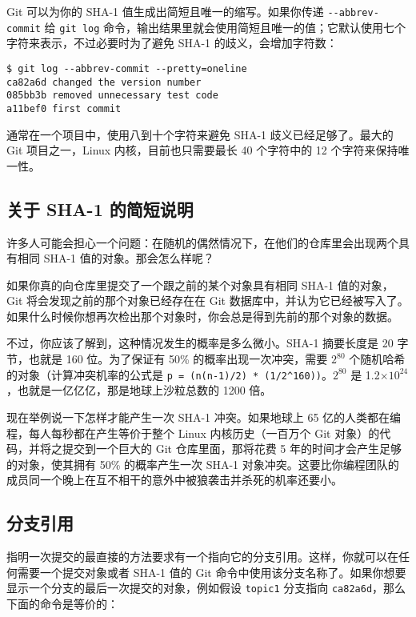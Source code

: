 \documentclass[a4paper]{book}
\newcommand{\e}[1]{$ \times 10^{#1}$}
\begin{document}
Git 可以为你的 SHA-1 值生成出简短且唯一的缩写。如果你传递 \texttt{-{}-abbrev-commit} 给 \texttt{git log} 命令，输出结果里就会使用简短且唯一的值；它默认使用七个字符来表示，不过必要时为了避免 SHA-1 的歧义，会增加字符数：

\begin{shaded}\begin{verbatim}
$ git log --abbrev-commit --pretty=oneline
ca82a6d changed the version number
085bb3b removed unnecessary test code
a11bef0 first commit
\end{verbatim}\end{shaded}

通常在一个项目中，使用八到十个字符来避免 SHA-1 歧义已经足够了。最大的 Git 项目之一，Linux 内核，目前也只需要最长 40 个字符中的 12 个字符来保持唯一性。

\subsection{关于 SHA-1 的简短说明}

许多人可能会担心一个问题：在随机的偶然情况下，在他们的仓库里会出现两个具有相同 SHA-1 值的对象。那会怎么样呢？

如果你真的向仓库里提交了一个跟之前的某个对象具有相同 SHA-1 值的对象，Git 将会发现之前的那个对象已经存在在 Git 数据库中，并认为它已经被写入了。如果什么时候你想再次检出那个对象时，你会总是得到先前的那个对象的数据。

不过，你应该了解到，这种情况发生的概率是多么微小。SHA-1 摘要长度是 20 字节，也就是 160 位。为了保证有 50\% 的概率出现一次冲突，需要 $2^{80}$ 个随机哈希的对象（计算冲突机率的公式是 \texttt{p = (n(n-1)/2) * (1/2\^{}160))}。$2^{80}$ 是 1.2\e{24}，也就是一亿亿亿，那是地球上沙粒总数的 1200 倍。

现在举例说一下怎样才能产生一次 SHA-1 冲突。如果地球上 65 亿的人类都在编程，每人每秒都在产生等价于整个 Linux 内核历史（一百万个 Git 对象）的代码，并将之提交到一个巨大的 Git 仓库里面，那将花费 5 年的时间才会产生足够的对象，使其拥有 50\% 的概率产生一次 SHA-1 对象冲突。这要比你编程团队的成员同一个晚上在互不相干的意外中被狼袭击并杀死的机率还要小。

\subsection{分支引用}

指明一次提交的最直接的方法要求有一个指向它的分支引用。这样，你就可以在任何需要一个提交对象或者 SHA-1 值的 Git 命令中使用该分支名称了。如果你想要显示一个分支的最后一次提交的对象，例如假设 \texttt{topic1} 分支指向 \texttt{ca82a6d}，那么下面的命令是等价的：
\end{document}
